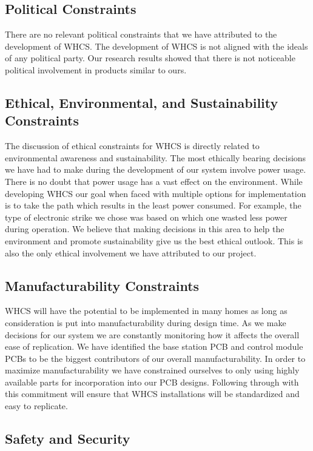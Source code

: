 \subsection{Political Constraints}
There are no relevant political constraints that we have attributed to the
development of WHCS. The development of WHCS is not aligned with the ideals of
any political party. Our research results showed that there is not noticeable
political involvement in products similar to ours.

\subsection{Ethical, Environmental, and Sustainability Constraints}
The discussion of ethical constraints for WHCS is directly related to
environmental awareness and sustainability. The most ethically bearing
decisions we have had to make during the development of our system involve
power usage. There is no doubt that power usage has a vast effect on the
environment. While developing WHCS our goal when faced with multiple options
for implementation is to take the path which results in the least power
consumed. For example, the type of electronic strike we chose was based on
which one wasted less power during operation. We believe that making decisions
in this area to help the environment and promote sustainability give us the
best ethical outlook. This is also the only ethical involvement we have
attributed to our project.

\subsection{Manufacturability Constraints}

WHCS will have the potential to be implemented in many homes as long as
consideration is put into manufacturability during design time. As we make
decisions for our system we are constantly monitoring how it affects the
overall ease of replication. We have identified the base station PCB and
control module PCBs to be the biggest contributors of our overall
manufacturability. In order to maximize manufacturability we have constrained
ourselves to only using highly available parts for incorporation into our PCB
designs. Following through with this commitment will ensure that WHCS
installations will be standardized and easy to replicate.

\subsection{Safety and Security}
\label{sec:safety-sec}

